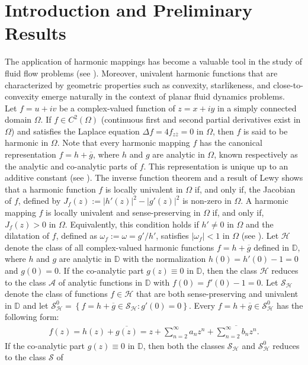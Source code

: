 \documentclass[11pt,reqno]{amsart}
\newtheorem{open problem}{Open problem}[section]
\newcommand{\ol}{\overline}
\newcommand{\bea}{\begin{eqnarray}}
\newcommand{\eea}{\end{eqnarray}}
\numberwithin{equation}{section}
\begin{document}
\section{Introduction and Preliminary Results}
\noindent The application of harmonic mappings has become a valuable tool in the study of fluid flow problems (see \cite{AC2014}). Moreover, univalent harmonic functions that are characterized by geometric properties such as convexity, starlikeness, and close-to-convexity emerge naturally in the context of planar fluid dynamics problems.\\[2mm]
\indent Let $f=u+iv$ be a complex-valued function of $z=x+i y$ in a simply connected domain $\Omega$. If $f\in C^2(\Omega)$ (continuous first and second partial derivatives exist in $\Omega$) and  satisfies the Laplace equation $\Delta f =4f_{z\ol z} = 0$ in $\Omega$, 
then $f$ is said to be harmonic in $\Omega$. Note that every harmonic mapping $f$ has the canonical representation $f = h + \ol g$, where $h$ and 
$g$ are analytic in $\Omega$, known respectively as the analytic and co-analytic parts of $f$. This representation is 
unique up to an additive constant (see \cite{D2004}). The inverse function theorem and a result of Lewy \cite{L1936} shows that a harmonic function $f$ is locally univalent in 
$\Omega$ if, and only if, the Jacobian  of $f$, defined by $J_f(z):=|h'(z)|^2-|g'(z)|^2$ is non-zero in $\Omega$. 
A harmonic mapping $f$ is locally univalent and sense-preserving in $\Omega$ if, and only if, $J_f (z) > 0$ in $\Omega$. Equivalently, this condition holds if $h'\ne 0$ in $\Omega$ and the dilatation of $f$, defined as $\omega_f:= \omega=g'/h'$, satisfies $|\omega_f| < 1$ in $\Omega$ (see \cite{L1936}). 
Let $\mathcal{H}$ denote the class of all complex-valued harmonic functions $f=h+\ol g$ defined in $\mathbb{D}$, where $h$ and $g$ are analytic in $\mathbb{D}$ with the normalization
$h(0)=h'(0)-1=0$ and $g(0)=0$. If the co-analytic part $g(z)\equiv 0$ in $\mathbb{D}$, then the class $\mathcal{H}$ reduces to the class $\mathcal{A}$ of analytic functions in 
$\mathbb{D}$ with $f(0)=f'(0)-1=0$.
Let $\mathcal{S}_{\mathcal{H}}$ denote the class of functions $f\in\mathcal{H}$ that are both sense-preserving and univalent in $\mathbb{D}$ and let 
$\mathcal{S}_{\mathcal{H}}^0=\left\{f=h+\ol g\in\mathcal{S}_{\mathcal{H}}: g'(0)=0 \right\}$. Every $f=h+\ol g\in\mathcal{S}_{\mathcal{H}}^0$ has the following form:
\bea\label{e1}f(z)=h(z)+\ol {g(z)}=z+\sum_{n=2}^\infty a_nz^n+\ol{\sum_{n=2}^\infty b_nz^n}. \eea
\indent If the co-analytic part $g(z)\equiv 0$ in $\mathbb{D}$, then both the classes $\mathcal{S}_{\mathcal{H}}$ and $\mathcal{S}_{\mathcal{H}}^0$ reduces to the class $\mathcal{S}$ of 
\end{document}
